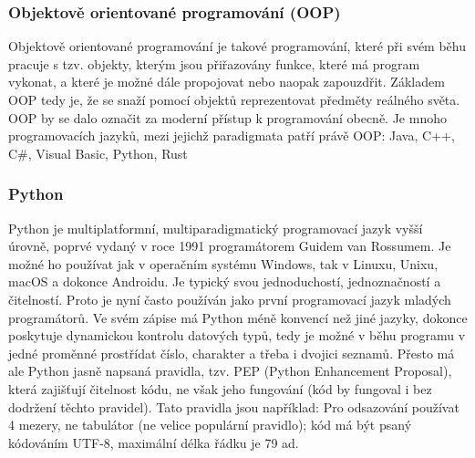 \documentclass{article}
\begin{document}
\subsubsection{Objektově orientované programování (OOP)}
Objektově orientované programování je takové programování, které při svém běhu pracuje s tzv. objekty, kterým jsou přiřazovány funkce, které má program vykonat, a které je možné dále propojovat nebo naopak zapouzdřit. Základem OOP tedy je, že se snaží pomocí objektů reprezentovat předměty reálného světa. OOP by se dalo označit za moderní přístup k programování obecně.
Je mnoho programovacích jazyků, mezi jejichž paradigmata patří právě OOP: Java, C++, C\#, Visual Basic, Python, Rust
\subsubsection{Python}
Python je multiplatformní, multiparadigmatický programovací jazyk vyšší úrovně, poprvé vydaný v roce 1991 programátorem Guidem van Rossumem. Je možné ho používat jak v operačním systému Windows, tak v Linuxu, Unixu, macOS a dokonce Androidu. Je typický svou jednoduchostí, jednoznačností a čitelností. Proto je nyní často používán jako první programovací jazyk mladých programátorů.
Ve svém zápise má Python méně konvencí než jiné jazyky, dokonce poskytuje dynamickou kontrolu datových typů, tedy je možné v běhu programu v jedné proměnné prostřídat číslo, charakter a třeba i dvojici seznamů. Přesto má ale Python jasně napsaná pravidla, tzv. PEP (Python Enhancement Proposal), která zajišťují čitelnost kódu, ne však jeho fungování (kód by fungoval i bez dodržení těchto pravidel). Tato pravidla jsou například: Pro odsazování používat 4 mezery, ne tabulátor (ne velice populární pravidlo); kód má být psaný kódováním UTF-8, maximální délka řádku je 79 ad. 
\end{document}
